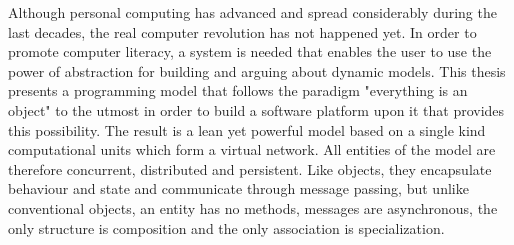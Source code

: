 


\begin{abstracts}        %

Although personal computing has advanced and spread considerably during the last decades, the real computer revolution has not happened yet. In order to promote computer literacy, a system is needed that enables the user to use the power of abstraction for building and arguing about dynamic models. This thesis presents a programming model that follows the paradigm "everything is an object" \cite{SmalltalkBlueBook} to the utmost in order to build a software platform upon it that provides this possibility. The result is a lean yet powerful model based on a single kind computational units which form a virtual network. All entities of the model are therefore concurrent, distributed and persistent. Like objects, they encapsulate behaviour and state and communicate through message passing, but unlike conventional objects, an entity has no methods, messages are asynchronous, the only structure is composition and the only association is specialization.

\end{abstracts}


